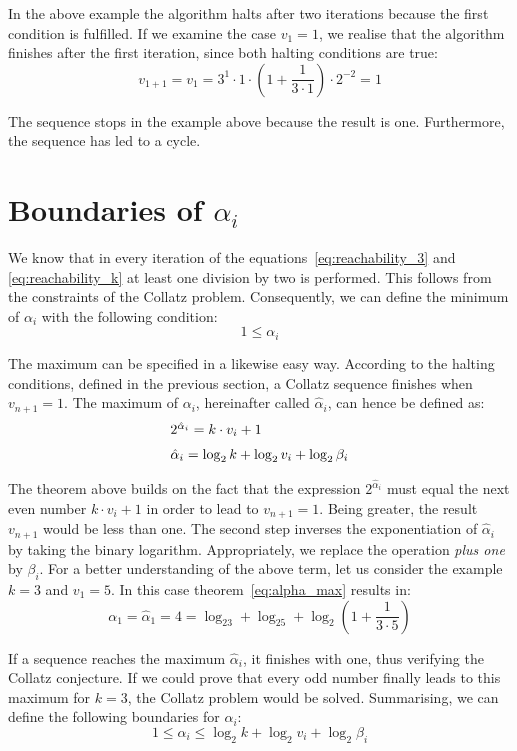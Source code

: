 \documentclass{SciPress_2015}
\begin{document}
In the above example the algorithm halts after two iterations because the first condition is fulfilled. If we examine the case $v_1=1$, we realise that the algorithm finishes after the first iteration, since both halting conditions are true:
\[
v_{1+1}=v_1=3^1\cdot 1\cdot\left(1+\frac{1}{3\cdot1}\right)\cdot2^{-2}=1
\]

The sequence stops in the example above because the result is one. Furthermore, the sequence has led to a cycle.

\section{Boundaries of \boldmath$\alpha_i$}
We know that in every iteration of the equations~\ref{eq:reachability_3} and \ref{eq:reachability_k} at least one division by two is performed. This follows from the constraints of the Collatz problem. Consequently, we can define the minimum of $\alpha_i$ with the following condition:
\[
1\le\alpha_i
\]

The maximum can be specified in a likewise easy way. According to the halting conditions, defined in the previous section, a Collatz sequence finishes when $v_{n+1}=1$. The maximum of $\alpha_i$, hereinafter called $\hat\alpha_i$, can hence be defined as:
\begin{equation}
\label{eq:alpha_max}
\begin{array}{l}
2^{\hat\alpha_i}=k\cdot v_i+1\\[\medskipamount]
\hat\alpha_i=\log_2k+\log_2v_i+\log_2\beta_i
\end{array}	
\end{equation}

The theorem above builds on the fact that the expression $2^{\hat\alpha_i}$ must equal the next even number $k\cdot v_i+1$ in order to lead to $v_{n+1}=1$. Being greater, the result $v_{n+1}$ would be less than one. The second step inverses the exponentiation of $\hat\alpha_i$ by taking the binary logarithm. Appropriately, we replace the operation \textit{plus one} by $\beta_i$. For a better understanding of the above term, let us consider the example $k=3$ and $v_1=5$. In this case theorem~\ref{eq:alpha_max} results in:
\[
\alpha_1=\hat\alpha_1=4=\log_23+\log_25+\log_2\left(1+\frac{1}{3\cdot5}\right)
\]

If a sequence reaches the maximum $\hat\alpha_i$, it finishes with one, thus verifying the Collatz conjecture. If we could prove that every odd number finally leads to this maximum for $k=3$, the Collatz problem would be solved. Summarising, we can define the following boundaries for $\alpha_i$:
\begin{equation}
\label{eq:boundary_alpha_i}
1\le\alpha_i\le\log_2k+\log_2v_i+\log_2\beta_i
\end{equation}
\end{document}
